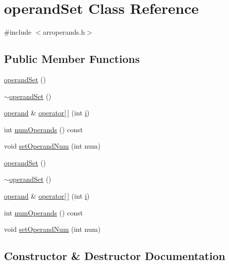 \hypertarget{classoperandSet}{}\section{operand\+Set Class Reference}
\label{classoperandSet}


{\ttfamily \#include $<$arroperands.\+h$>$}

\subsection*{Public Member Functions}
\begin{DoxyCompactItemize}
\item 
\hyperlink{classoperandSet_ab9dc049d836b5705d36e4fcc25a9e42e}{operand\+Set} ()
\item 
\hyperlink{classoperandSet_adc5f22cd9cc77040902ab29e15bcda27}{$\sim$operand\+Set} ()
\item 
\hyperlink{classoperand}{operand} \& \hyperlink{classoperandSet_ace88e330c3bb62273aba46cdb05e7981}{operator\mbox{[}$\,$\mbox{]}} (int \hyperlink{indexexpr_8h_aabd77643995707c185e95c8cb2782c81}{i})
\item 
int \hyperlink{classoperandSet_acdf4c393cd292f624e38eaefc40fe252}{num\+Operands} () const 
\item 
void \hyperlink{classoperandSet_a4d274653a2081fd002f0c2da30a32792}{set\+Operand\+Num} (int num)
\item 
\hyperlink{classoperandSet_ab9dc049d836b5705d36e4fcc25a9e42e}{operand\+Set} ()
\item 
\hyperlink{classoperandSet_adc5f22cd9cc77040902ab29e15bcda27}{$\sim$operand\+Set} ()
\item 
\hyperlink{classoperand}{operand} \& \hyperlink{classoperandSet_ace88e330c3bb62273aba46cdb05e7981}{operator\mbox{[}$\,$\mbox{]}} (int \hyperlink{indexexpr_8h_aabd77643995707c185e95c8cb2782c81}{i})
\item 
int \hyperlink{classoperandSet_acdf4c393cd292f624e38eaefc40fe252}{num\+Operands} () const 
\item 
void \hyperlink{classoperandSet_a4d274653a2081fd002f0c2da30a32792}{set\+Operand\+Num} (int num)
\end{DoxyCompactItemize}


\subsection{Constructor \& Destructor Documentation}
\hypertarget{classoperandSet_ab9dc049d836b5705d36e4fcc25a9e42e}{}
